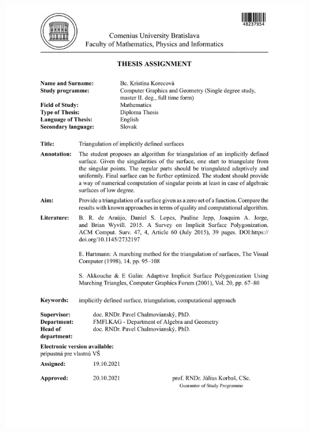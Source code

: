 \documentclass[12pt, twoside]{book}
\begin{document}
\hspace{-2cm}\includegraphics[page=1,width=1.1\textwidth]{images/zadanie-sk}
\end{document}
